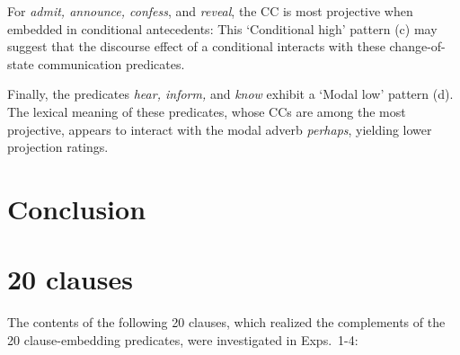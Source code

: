 \documentclass[a4paper,12pt,twoside]{article}
\begin{document}
	For \emph{admit, announce, confess}, and \emph{reveal}, the CC is most projective when embedded in conditional antecedents: This `Conditional high' pattern (c) may suggest that the discourse effect of a conditional interacts with these change-of-state communication predicates.
	
	Finally, the predicates \emph{hear, inform,} and \emph{know} exhibit a `Modal low' pattern (d). The lexical meaning of these predicates, whose CCs are among the most projective, appears to interact with the modal adverb {\em perhaps}, yielding lower projection ratings.

\section{Conclusion}






\newpage
\appendix

\section{20 clauses}\label{app:a-clauses}
    The contents of the following 20 clauses, which realized the complements of the 20 clause-embedding predicates, were investigated in Exps.~1-4:
\end{document}
